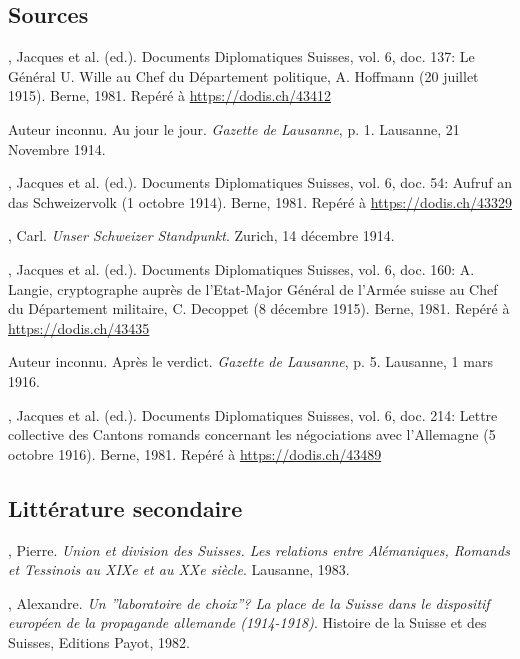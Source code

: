 \documentclass[french,a4paper]{article}
\begin{document}
\begin{thebibliography}{9}

\subsection*{Sources}

, Jacques et al. (ed.).
Documents Diplomatiques Suisses, vol. 6, doc. 137: \og Le Général U. Wille au Chef du Département politique, A. Hoffmann \fg{} (20 juillet 1915).
Berne, 1981. Repéré à \url{https://dodis.ch/43412}

Auteur inconnu.
Au jour le jour. \textit{Gazette de Lausanne}, p. 1.
Lausanne, 21 Novembre 1914.

, Jacques et al. (ed.).
Documents Diplomatiques Suisses, vol. 6, doc. 54: \og Aufruf an das Schweizervolk \fg{} (1\ier{} octobre 1914).
Berne, 1981.
Repéré à \url{https://dodis.ch/43329}

, Carl.
\textit{Unser Schweizer Standpunkt}.
Zurich, 14 décembre 1914.

, Jacques et al. (ed.).
Documents Diplomatiques Suisses, vol. 6, doc. 160: \og A. Langie, cryptographe auprès de l’Etat-Major Général de l’Armée suisse au Chef du Département militaire, C. Decoppet \fg{} (8 décembre 1915).
Berne, 1981. Repéré à \url{https://dodis.ch/43435}

Auteur inconnu.
Après le verdict. \textit{Gazette de Lausanne}, p. 5.
Lausanne, 1\ier{} mars 1916.

, Jacques et al. (ed.).
Documents Diplomatiques Suisses, vol. 6, doc. 214: \og Lettre collective des Cantons romands concernant les négociations avec l’Allemagne \fg{} (5 octobre 1916).
Berne, 1981. Repéré à \url{https://dodis.ch/43489}

\subsection*{Littérature secondaire}

, Pierre.
\textit{Union et division des Suisses. Les relations entre Alémaniques, Romands et Tessinois au XIXe et au XXe siècle}.
Lausanne, 1983.

, Alexandre.
\textit{Un ”laboratoire de choix”? La place de la Suisse dans le dispositif européen de la propagande allemande (1914-1918)}. 
Histoire de la Suisse et des Suisses, Editions Payot, 1982.


\end{thebibliography}
\end{document}
